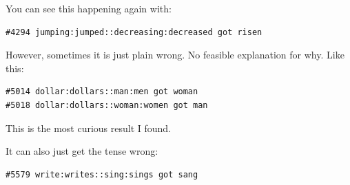 \documentclass[12pt]{article}
\theoremstyle{definitionstyle}
\begin{document}
\begin{enumerate}[leftmargin=\labelsep]
\begin{enumerate}[label=\textbf{(\alph*)}]
                 You can see this happening again with:
                 \begin{lstlisting}
#4294 jumping:jumped::decreasing:decreased got risen
                 \end{lstlisting}

                 However, sometimes it is just plain wrong. No feasible explanation for why. Like this:
                 \begin{lstlisting}
#5014 dollar:dollars::man:men got woman
#5018 dollar:dollars::woman:women got man
                 \end{lstlisting}
                 This is the most curious result I found. 

                 It can also just get the tense wrong:
                 \begin{lstlisting}
#5579 write:writes::sing:sings got sang
                 \end{lstlisting}


\end{enumerate}
\end{enumerate}
\end{document}
